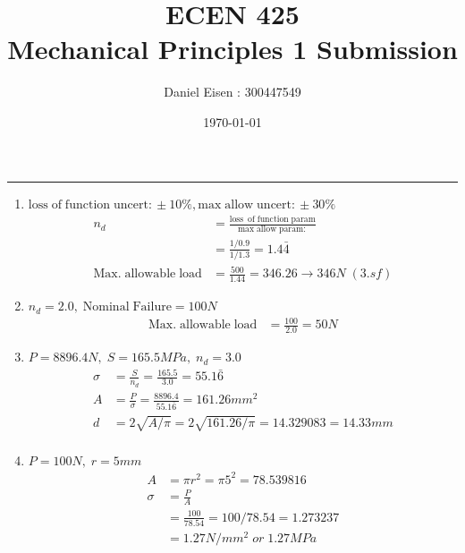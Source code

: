 \documentclass[11pt]{article}
\title{ECEN 425 \\ Mechanical Principles 1 Submission}
\author{Daniel Eisen : 300447549}
\date{\today}
\begin{document}
\maketitle
\hrule
\begin{enumerate}
      \item $\mathrm{loss \; of \; function \; uncert:}\pm 10\%, \mathrm{max \; allow \; uncert:}\pm 30\%$
            \begin{align*}
                  n_d                                & = \frac{\mathrm{loss\ \; of \; function \; param}}{\mathrm{max \; allow \; param:}} \\
                                                     & = \frac{1/0.9}{1/1.3}=1.4\bar{4}                                                    \\
                  \mathrm{Max. \; allowable \; load} & = \frac{500}{1.44} = 346.26 \rightarrow 346N \; (3.sf)
            \end{align*}
      \item $n_d = 2.0, \; \mathrm{Nominal \; Failure} = 100N$
            \begin{align*}
                  \mathrm{Max. \; allowable \; load} & = \frac{100}{2.0} = 50N
            \end{align*}
      \item $P=8896.4N,\; S=165.5MPa,\; n_d=3.0$
            \begin{align*}
                  \sigma & = \frac{S}{n_d} = \frac{165.5}{3.0}=55.1\bar{6}            \\
                  A      & = \frac{P}{\sigma} = \frac{8896.4}{55.1\bar{6}}=161.26mm^2 \\
                  d      & = 2\sqrt{A/\pi} = 2\sqrt{161.26/\pi}=14.329083 = 14.33mm   \\
            \end{align*}
      \item $P=100N,\; r=5mm$
            \begin{align*}
                  A      & = \pi r^2 = \pi 5^2 = 78.539816          \\
                  \sigma & = \frac{P}{A}                            \\
                         & = \frac{100}{78.54} = 100/78.54=1.273237 \\
                         & = 1.27 N/mm^2 \; or \; 1.27MPa

\end{align*}
\end{enumerate}
\end{document}
